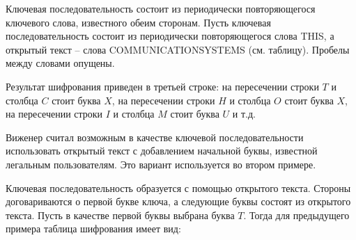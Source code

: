 \example
Ключевая последовательность состоит из периодически повторяющегося ключевого слова, известного обеим сторонам. Пусть ключевая последовательность состоит из периодически повторяющегося слова THIS, а открытый текст -- слова COMMUNICATIONSYSTEMS (см. таблицу). Пробелы между словами опущены.
\begin{center}  \end{center}
Результат шифрования приведен в третьей строке: на пересечении строки $T$ и столбца $C$ стоит буква $X$, на пересечении строки $H$ и столбца $O$ стоит буква $X$, на пересечении строки $I$ и столбца  $M$ стоит буква $U$ и т.д.
\exampleend

Виженер считал возможным в качестве ключевой последовательности использовать открытый текст с добавлением начальной буквы, известной легальным пользователям. Это вариант используется во втором примере.

\example
Ключевая последовательность образуется с помощью открытого текста. Стороны договариваются о первой букве ключа, а следующие буквы состоят из открытого текста. Пусть в качестве первой буквы выбрана буква  $T$. Тогда для предыдущего примера таблица шифрования имеет вид:
\begin{center}  \end{center}
\exampleend

